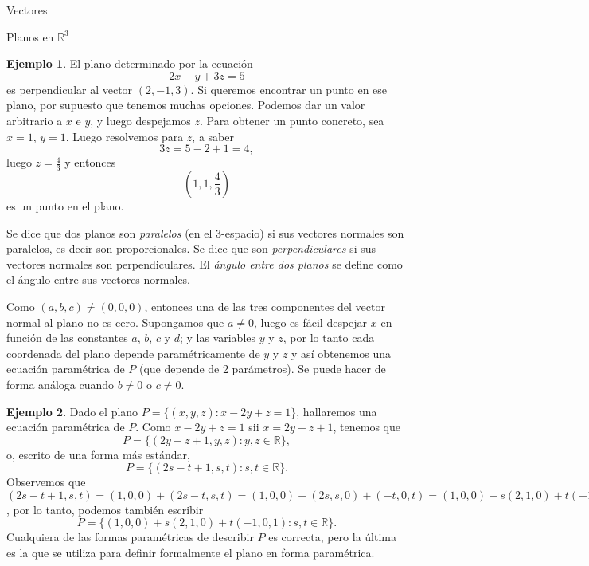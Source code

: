 \documentclass[a4paper,12pt,twoside,spanish]{amsbook}
\theoremstyle{definition}
\newtheorem{ejemplo}{Ejemplo}[section]
\theoremstyle{remark}
\newcommand{\R}{\mathbb R}
\begin{document}
\begin{chapter}{Vectores}
\begin{section}{Planos en $\R^3$}
		\begin{ejemplo}
			El plano determinado por la ecuación
			\begin{equation*}
				2x - y 	+ 3z = 	5
			\end{equation*}
			es perpendicular al vector $(2, - 1, 3)$. Si queremos encontrar un punto en ese plano, por supuesto que tenemos muchas opciones. Podemos dar un valor arbitrario a $x$ e $y$, y luego despejamos $z$. Para obtener un punto concreto, sea $x = 1$, $y = 1$. Luego resolvemos para $z$, a saber
			\begin{equation*}
				3z 	= 5 - 2 + 1 = 4,
			\end{equation*}
			luego $z = \displaystyle\frac43$ y entonces
			\begin{equation*}
				(1,1,\frac43)
			\end{equation*}
			es un punto en el plano.
		\end{ejemplo}
		
		Se dice que dos planos son \textit{paralelos} (en el 3-espacio) si sus vectores normales son paralelos,  es decir son proporcionales. Se dice que son \textit{perpendiculares} si sus vectores normales son perpendiculares. El \textit{ángulo entre dos planos} se define como el ángulo entre sus vectores normales.
		
		
		
		Como $(a,b,c) \ne (0,0,0)$,  entonces una de las tres componentes del vector normal al plano no es cero. Supongamos que $a\ne 0$,  luego es fácil despejar $x$ en función de las constantes $a$, $b$, $c$ y $d$; y las variables $y$ y $z$, por lo tanto cada coordenada del plano depende paramétricamente de $y$ y $z$ y así obtenemos una ecuación paramétrica de $P$ (que depende de 2 parámetros). Se puede hacer de forma análoga cuando $b\ne 0$ o $c \ne 0$. 
		
		\begin{ejemplo}
			Dado el plano $P = \{(x,y,z): x -2y +z =1\}$,  hallaremos una ecuación paramétrica de $P$. Como  $x -2y +z =1$ sii  $x = 2y-z +1$, tenemos que
			\begin{equation*}
				P = \{(2y-z +1,y,z): y,z \in \R\},
			\end{equation*}
			o,  escrito de una forma más estándar,
			\begin{equation*}
			P = \{(2s-t +1,s,t): s,t \in \R\}. 
			\end{equation*}
			Observemos que $(2s-t +1,s,t) = (1,0,0) + (2s-t,s,t)= (1,0,0) + (2s,s,0) + (-t,0,t) = (1,0,0) + s(2,1,0) + t(-1,0,1) $, por lo tanto, podemos también escribir
			\begin{equation*}
			P = \{(1,0,0) + s(2,1,0) + t(-1,0,1): s,t \in \R\}. 
			\end{equation*}
			Cualquiera de las formas paramétricas de describir $P$  es correcta, pero la última es la que se utiliza para definir formalmente el plano en forma paramétrica. 
			

\end{ejemplo}
\end{section}
\end{chapter}
\end{document}
